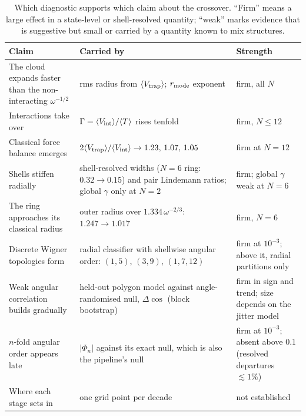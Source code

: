 \begin{table}[htbp]
\centering
\caption[Which diagnostic supports which claim]{Which diagnostic supports which claim about
the crossover. ``Firm'' means a large effect in a state-level or shell-resolved quantity;
``weak'' marks evidence that is suggestive but small or carried by a quantity known to
mix structures.}
\label{tab:wigner-evidence}
\small
\renewcommand{\arraystretch}{1.2}
\begin{tabular}{@{}>{\raggedright\arraybackslash}p{}
                >{\raggedright\arraybackslash}p{}
                >{\raggedright\arraybackslash}p{}@{}}
\toprule
Claim & Carried by & Strength \\
\midrule
The cloud expands faster than the non-interacting $\omega^{-1/2}$ &
rms radius from $\langle V_{\rm trap}\rangle$; $r_{\rm mode}$ exponent &
firm, all $N$ \\
Interactions take over &
$\Gamma=\langle V_{\rm int}\rangle/\langle T\rangle$ rises tenfold &
firm, $N\le12$ \\
Classical force balance emerges &
$2\langle V_{\rm trap}\rangle/\langle V_{\rm int}\rangle\to1.23,\,1.07,\,1.05$ &
firm at $N{=}12$ \\
Shells stiffen radially &
shell-resolved widths ($N{=}6$ ring: $0.32\to0.15$) and pair Lindemann ratios; global
$\gamma$ only at $N{=}2$ &
firm; global $\gamma$ weak at $N{=}6$ \\
The ring approaches its classical radius &
outer radius over $1.334\,\omega^{-2/3}$: $1.247\to1.017$ &
firm, $N{=}6$ \\
Discrete Wigner topologies form &
radial classifier with shellwise angular order: $(1,5)$, $(3,9)$, $(1,7,12)$ &
firm at $10^{-3}$; above it, radial partitions only \\
Weak angular correlation builds gradually &
held-out polygon model against angle-randomised null, $\Delta\cos$ (block bootstrap) &
firm in sign and trend; size depends on the jitter model \\
$n$-fold angular order appears late &
$|\Phi_n|$ against its exact null, which is also the pipeline's null &
firm at $10^{-3}$; absent above $0.1$ (resolved departures ${\lesssim}1\%$) \\
Where each stage sets in &
one grid point per decade &
not established \\
\bottomrule
\end{tabular}
\end{table}


